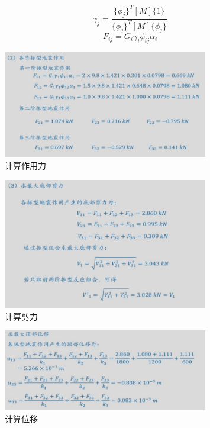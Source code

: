 \documentclass[12pt, a4paper, oneside, UTF8]{ctexbook}
\begin{document}
\begin{remark}
    \[
    \gamma_j = \frac{\{\phi_j\}^T [M] \{1\}}{\{\phi_j\}^T [M] \{\phi_j\}}
    \]
    \[
    F_{ij}=G_i\gamma_{i}\phi_{ij}\alpha_{i}
    \]
\end{remark}

\begin{figure}[H]
    \centering
    \includegraphics[width=0.8\textwidth]{../figure/ex1.png}
    \caption{计算作用力}
\end{figure}

\begin{figure}[H]
    \centering
    \includegraphics[width=0.8\textwidth]{../figure/ex2.png}
    \caption{计算剪力}
\end{figure}

\begin{figure}[H]
    \centering
    \includegraphics[width=0.8\textwidth]{../figure/ex3.png}
    \caption{计算位移}
\end{figure}
\end{document}
